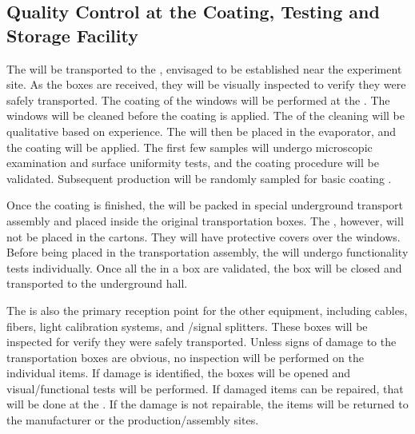 \subsection{Quality Control at the Coating, Testing and Storage Facility}

The  will be transported to the , envisaged to be established %
near the experiment site. As the  boxes are received, they will be visually inspected to verify they were safely transported. The  coating of the  windows will be performed at the . The  windows will be cleaned before the coating is applied. The  of the cleaning will be qualitative based on experience. The  will then be placed in the evaporator, and the coating will be applied. The first few samples will undergo microscopic examination and surface uniformity tests, and the coating procedure will be validated. Subsequent production  will be randomly sampled for basic coating .

Once the coating is finished, the  will be packed in special underground transport assembly and placed inside the original transportation boxes. The , however, will not be placed in the cartons. They will have protective covers over the windows. Before being placed in the transportation assembly, the  will undergo functionality tests individually. Once all the  in a box are validated, the box will be closed and transported to the underground hall.

The  is also the primary reception point for the other   equipment, including cables, fibers, light calibration systems, and /signal splitters. These boxes will be inspected for verify they were safely transported. Unless signs of  damage to the transportation boxes are obvious, no  inspection will be performed on the individual items. If  damage is identified, the boxes will be opened and visual/functional  tests will be performed. If damaged items can be repaired, that will be done at the . If the damage is not repairable, the items will be returned to the manufacturer or the production/assembly sites.

